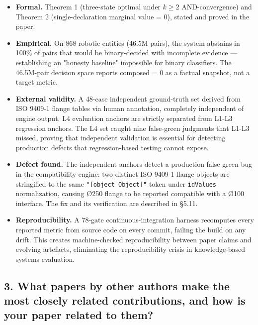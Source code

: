 \documentclass[11pt]{article}
\begin{document}
\begin{itemize}[leftmargin=*]
    \item \textbf{Formal.} Theorem 1 (three-state optimal under $k \ge 2$ AND-convergence) and Theorem 2 (single-declaration marginal value = 0), stated and proved in the paper.
    
    \item \textbf{Empirical.} On 868 robotic entities (46.5M pairs), the system abstains in 100\% of pairs that would be binary-decided with incomplete evidence --- establishing an "honesty baseline" impossible for binary classifiers. The 46.5M-pair decision space reports composed = 0 as a factual snapshot, not a target metric.
    
    \item \textbf{External validity.} A 48-case independent ground-truth set derived from ISO 9409-1 flange tables via human annotation, completely independent of engine output. L4 evaluation anchors are strictly separated from L1-L3 regression anchors. The L4 set caught nine false-green judgments that L1-L3 missed, proving that independent validation is essential for detecting production defects that regression-based testing cannot expose.
    
    \item \textbf{Defect found.} The independent anchors detect a production false-green bug in the compatibility engine: two distinct ISO 9409-1 flange objects are stringified to the same \texttt{"[object Object]"} token under \texttt{idValues} normalization, causing Ø250 flange to be reported compatible with a Ø100 interface. The fix and its verification are described in §5.11.
    
    \item \textbf{Reproducibility.} A 78-gate continuous-integration harness recomputes every reported metric from source code on every commit, failing the build on any drift. This creates machine-checked reproducibility between paper claims and evolving artefacts, eliminating the reproducibility crisis in knowledge-based systems evaluation.
\end{itemize}

\subsection*{3. What papers by other authors make the most closely related contributions, and how is your paper related to them?}
\end{document}
